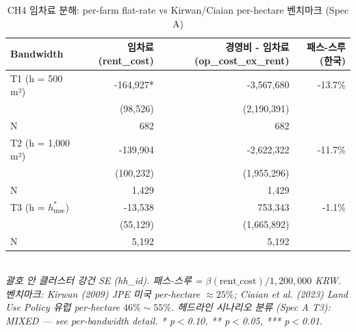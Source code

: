 \begin{table}[t]
\centering
\caption{CH4 임차료 분해: per-farm flat-rate vs Kirwan/Ciaian per-hectare 벤치마크 (Spec A)}
\label{tab:ch4_rent_ko}
\begin{tabular}{lrrr}
\toprule
Bandwidth & 임차료 (rent\_cost) & 경영비 - 임차료 (op\_cost\_ex\_rent) & 패스-스루 (한국) \\
\midrule
T1 (h = 500 m²) & -164,927* & -3,567,680 & -13.7\% \\
        & (98,526) & (2,190,391) & \\
N       & 682 & 682 & \\
T2 (h = 1,000 m²) & -139,904 & -2,622,322 & -11.7\% \\
        & (100,232) & (1,955,296) & \\
N       & 1,429 & 1,429 & \\
T3 (h = $h^{*}_{\mathrm{mse}}$) & -13,538 & 753,343 & -1.1\% \\
        & (55,129) & (1,665,892) & \\
N       & 5,192 & 5,192 & \\
\bottomrule
\end{tabular}
\\
\footnotesize\textit{괄호 안 클러스터 강건 SE (hh\_id). 패스-스루 = $\beta(\text{rent\_cost}) / 1{,}200{,}000$ KRW. 벤치마크: Kirwan (2009) JPE 미국 per-hectare $\approx 25\%$; Ciaian et al. (2023) Land Use Policy 유럽 per-hectare $46\% \sim 55\%$. 헤드라인 시나리오 분류 (Spec A T3): MIXED — see per-bandwidth detail. * p$<$0.10, ** p$<$0.05, *** p$<$0.01.}
\end{table}

